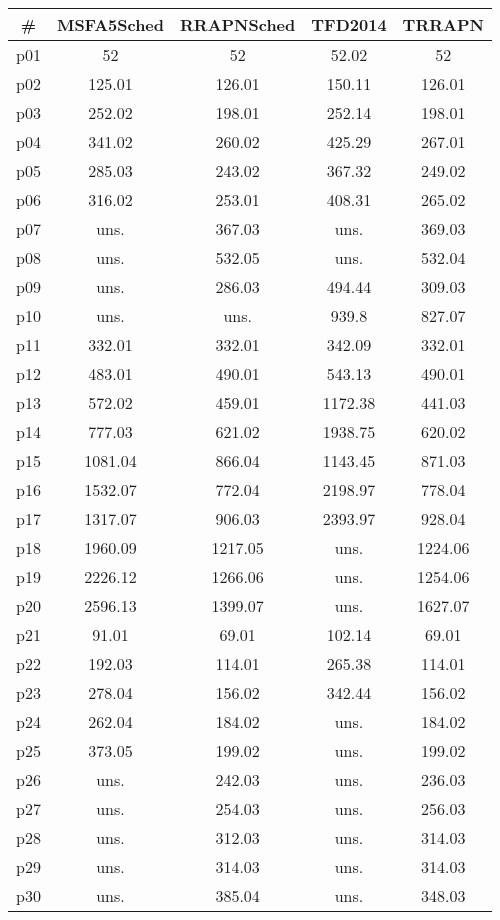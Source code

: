 \begin{tabular}{ccccc}
\toprule
\textbf{\#} & \textbf{MSFA5Sched} & \textbf{RRAPNSched} & \textbf{TFD2014} & \textbf{TRRAPN}\\
\midrule
p01 & 52 & 52 & 52.02 & 52\\
p02 & 125.01 & 126.01 & 150.11 & 126.01\\
p03 & 252.02 & 198.01 & 252.14 & 198.01\\
p04 & 341.02 & 260.02 & 425.29 & 267.01\\
p05 & 285.03 & 243.02 & 367.32 & 249.02\\
p06 & 316.02 & 253.01 & 408.31 & 265.02\\
p07 & uns. & 367.03 & uns. & 369.03\\
p08 & uns. & 532.05 & uns. & 532.04\\
p09 & uns. & 286.03 & 494.44 & 309.03\\
p10 & uns. & uns. & 939.8 & 827.07\\
p11 & 332.01 & 332.01 & 342.09 & 332.01\\
p12 & 483.01 & 490.01 & 543.13 & 490.01\\
p13 & 572.02 & 459.01 & 1172.38 & 441.03\\
p14 & 777.03 & 621.02 & 1938.75 & 620.02\\
p15 & 1081.04 & 866.04 & 1143.45 & 871.03\\
p16 & 1532.07 & 772.04 & 2198.97 & 778.04\\
p17 & 1317.07 & 906.03 & 2393.97 & 928.04\\
p18 & 1960.09 & 1217.05 & uns. & 1224.06\\
p19 & 2226.12 & 1266.06 & uns. & 1254.06\\
p20 & 2596.13 & 1399.07 & uns. & 1627.07\\
p21 & 91.01 & 69.01 & 102.14 & 69.01\\
p22 & 192.03 & 114.01 & 265.38 & 114.01\\
p23 & 278.04 & 156.02 & 342.44 & 156.02\\
p24 & 262.04 & 184.02 & uns. & 184.02\\
p25 & 373.05 & 199.02 & uns. & 199.02\\
p26 & uns. & 242.03 & uns. & 236.03\\
p27 & uns. & 254.03 & uns. & 256.03\\
p28 & uns. & 312.03 & uns. & 314.03\\
p29 & uns. & 314.03 & uns. & 314.03\\
p30 & uns. & 385.04 & uns. & 348.03\\
\bottomrule
\end{tabular}

